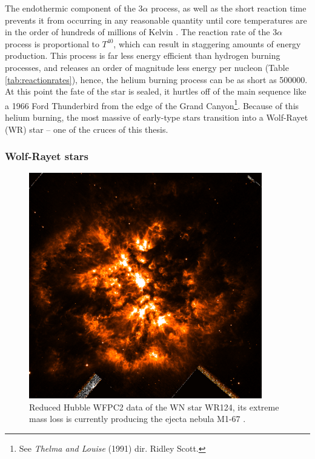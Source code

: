 \noindent
The endothermic component of the 3$\alpha$ process, as well as the short reaction time prevents it from occurring in any reasonable quantity until core temperatures are in the order of hundreds of millions of Kelvin
\parencite[Pt.~6]{kippenhahnStellarStructureEvolution2012}.
The reaction rate of the 3$\alpha$ process is proportional to $T^{40}$, which can result in staggering amounts of energy production.
This process is far less energy efficient than hydrogen burning processes, and releases an order of magnitude less energy per nucleon (Table \ref{tab:reactionrates}), hence, the helium burning process can be as short as \SI{500000}{\year}.
At this point the fate of the star is sealed, it hurtles off of the main sequence like a 1966 Ford Thunderbird from the edge of the Grand Canyon\footnote{See \emph{Thelma and Louise} (1991) dir. Ridley Scott.}.
Because of this helium burning, the most massive of early-type stars transition into a Wolf-Rayet (WR) star -- one of the cruces of this thesis.

\subsubsection{Wolf-Rayet stars}
\label{sec:wrtype}

\begin{figure}[ht]
  \centering
  \includegraphics[width=4in]{assets/WR124.png}
  \caption[\textit{M1-67 nebula around WR124 \parencite{2010ApJ...724L..90M}}]{Reduced Hubble WFPC2 data of the WN star WR124, its extreme mass loss is currently producing the ejecta nebula M1-67 \parencite{2010ApJ...724L..90M}.}
  \label{fig:wr124}
\end{figure}

